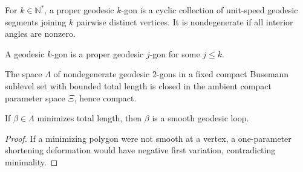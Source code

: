 \begin{definition}
\label{appb-def-proper-geodesic-k-gon}
For $k\in\mathbb N^*$, a proper geodesic $k$-gon is a cyclic collection of unit-speed geodesic segments joining $k$ pairwise distinct vertices. It is nondegenerate if all interior angles are nonzero.
\end{definition}

\begin{definition}
\label{appb-def-geodesic-k-gon}
A geodesic $k$-gon is a proper geodesic $j$-gon for some $j\le k$.
\end{definition}

\begin{lemma}
\label{appb-lem-polygon-space-compact}
The space $\Lambda$ of nondegenerate geodesic $2$-gons in a fixed compact Busemann sublevel set with bounded total length is closed in the ambient compact parameter space $\Xi$, hence compact.
\end{lemma}

\begin{lemma}
\label{appb-lem-minimizing-polygon-smooth}
If $\beta\in\Lambda$ minimizes total length, then $\beta$ is a smooth geodesic loop.
\end{lemma}

\begin{proof}
\sketch If a minimizing polygon were not smooth at a vertex, a one-parameter shortening deformation would have negative first variation, contradicting minimality.
\end{proof}
